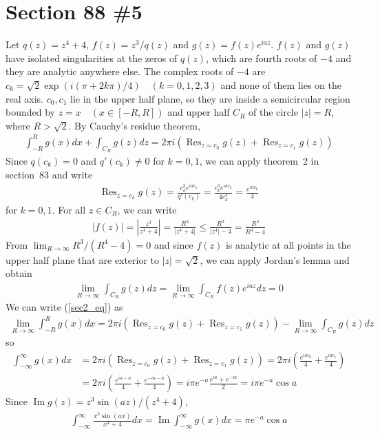 \documentclass{scrartcl}
\newcommand{\imag}{\operatorname{Im}}
\DeclareMathOperator*{\Res}{Res}
\begin{document}
\section{Section 88 \#5}
Let \(q(z) = z^4 + 4,\, f(z) = z^3 / q(z)\) and \(g(z) = f(z) e^{iaz}\).
\(f(z)\) and \(g(z)\) have isolated singularities at the zeros of \(q(z)\), which are fourth roots of \(-4\) and they are analytic anywhere else.
The complex roots of \(-4\) are \(c_k = \sqrt{2} \exp(i(\pi + 2k\pi) / 4) \quad (k = 0, 1, 2, 3)\) and none of them lies on the real axis.
\(c_0, c_1\) lie in the upper half plane, so they are inside a semicircular region bounded by \(z = x \quad (x \in [-R, R])\) and upper half \(C_R\) of the circle \(|z| = R\), where \(R > \sqrt{2}\).
By Cauchy's residue theorem,
\begin{align}\label{sec2_eq}
  \int^R_{-R} g(x) dx + \int_{C_R} g(z) dz
  = 2\pi i \left( \Res_{z = c_0} g(z) + \Res_{z = c_1} g(z) \right)
\end{align}
Since \(q(c_k) = 0\) and \(q'(c_k) \not = 0\) for \(k = 0, 1\), we can apply theorem~2 in section~83 and write
\begin{align*}
  \Res_{z = c_k} g(z)
  = \frac{c_k^3 e^{iac_k}}{q'(c_k)}
  = \frac{c_k^3 e^{iac_k}}{4c_k^3}
  = \frac{e^{iac_k}}{4}
\end{align*}
for \(k = 0, 1\).
For all \(z \in C_R\), we can write
\begin{align*}
  |f(z)| = \left| \frac{z^3}{z^4 + 4} \right| = \frac{R^3}{|z^4 + 4|} \leq \frac{R^3}{|z^4| - 4} = \frac{R^3}{R^4 - 4}
\end{align*}
From \(\lim_{R \to \infty} R^3 / (R^4 - 4) = 0\) and since \(f(z)\) is analytic at all points in the upper half plane that are exterior to \(|z| = \sqrt{2}\), we can apply Jordan's lemma and obtain
\begin{align*}
  \lim_{R \to \infty} \int_{C_R} g(z) dz = \lim_{R \to \infty} \int_{C_R} f(z) e^{iaz} dz = 0
\end{align*}
We can write (\ref{sec2_eq}) as
\begin{align*}
  \lim_{R \to \infty} \int^R_{-R} g(x) dx
  = 2\pi i \left( \Res_{z = c_0} g(z) + \Res_{z = c_1} g(z) \right) - \lim_{R \to \infty} \int_{C_R} g(z) dz
\end{align*}
so
\begin{align*}
  \int^\infty_{-\infty} g(x) dx
  &= 2\pi i \left( \Res_{z = c_0} g(z) + \Res_{z = c_1} g(z) \right)
  = 2\pi i \left( \frac{e^{iac_0}}{4} + \frac{e^{iac_1}}{4} \right) \\
  &= 2\pi i \left( \frac{e^{ia - a}}{4} + \frac{e^{-ia - a}}{4} \right)
  = i \pi e^{-a} \frac{e^{ia} + e^{-ia}}{2}
  = i \pi e^{-a} \cos a
\end{align*}
Since \(\imag g(z) = z^3 \sin (az) / (z^4 + 4)\),
\begin{align*}
  \int^\infty_{-\infty} \frac{x^3 \sin (ax)}{x^4 + 4} dx = \imag \int^\infty_{-\infty} g(x) dx = \pi e^{-a} \cos a
\end{align*}
\end{document}
